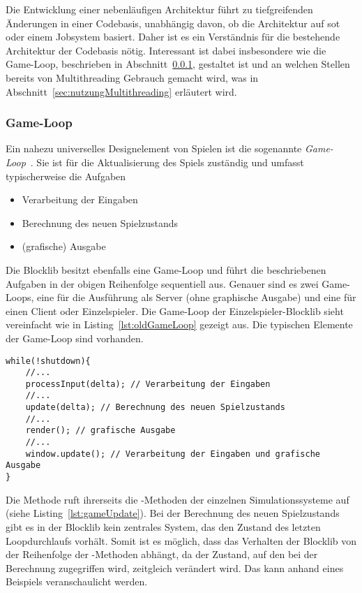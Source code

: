 Die Entwicklung einer nebenläufigen Architektur führt zu
 tiefgreifenden Änderungen in einer Codebasis, unabhängig davon, ob die Architektur auf \ac{sot} oder einem Jobsystem basiert. Daher ist es ein Verständnis für die bestehende Architektur der Codebasis nötig. Interessant ist dabei insbesondere wie die Game-Loop, beschrieben in Abschnitt~\ref{sec:gameLoop}, gestaltet ist und an welchen Stellen bereits von Multithreading Gebrauch gemacht wird, was in Abschnitt~\ref{sec:nutzungMultithreading} erläutert wird.

\subsubsection{Game-Loop}\label{sec:gameLoop}
Ein nahezu universelles Designelement von Spielen ist die sogenannte \emph{Game-Loop}~\cite[S.~161~\psqq]{Nystrom2015}. Sie ist für die Aktualisierung des Spiels zuständig und umfasst typischerweise die Aufgaben 
\begin{itemize}
  \item Verarbeitung der Eingaben
  \item Berechnung des neuen Spielzustands
  \item (grafische) Ausgabe
\end{itemize}
Die Blocklib besitzt ebenfalls eine Game-Loop und führt die beschriebenen Aufgaben in der obigen Reihenfolge sequentiell aus. Genauer sind es zwei Game-Loops, eine für die Ausführung als Server (ohne graphische Ausgabe) und eine für einen Client oder Einzelspieler. Die Game-Loop der Einzelspieler-Blocklib sieht vereinfacht wie in Listing~\ref{lst:oldGameLoop} gezeigt aus. Die typischen Elemente der Game-Loop sind vorhanden.

\begin{lstlisting}[caption={Vereinfachte Version der Blocklib für Einzelspieler.},label={lst:oldGameLoop},float={htbp}]
while(!shutdown){
	//...
	processInput(delta); // Verarbeitung der Eingaben
	//...
	update(delta); // Berechnung des neuen Spielzustands
	//...
	render(); // grafische Ausgabe
	//...
	window.update(); // Verarbeitung der Eingaben und grafische Ausgabe
}
\end{lstlisting}

Die Methode  ruft ihrerseits die -Methoden der einzelnen Simulationssysteme auf (siehe Listing~\ref{lst:gameUpdate}).
Bei der Berechnung des neuen Spielzustands gibt es in der Blocklib kein zentrales System, das den Zustand des letzten Loopdurchlaufs vorhält. Somit ist es möglich, dass das Verhalten der Blocklib von der Reihenfolge der -Methoden abhängt, da der Zustand, auf den bei der Berechnung zugegriffen wird, zeitgleich verändert wird. Das kann anhand eines Beispiels veranschaulicht werden. 

